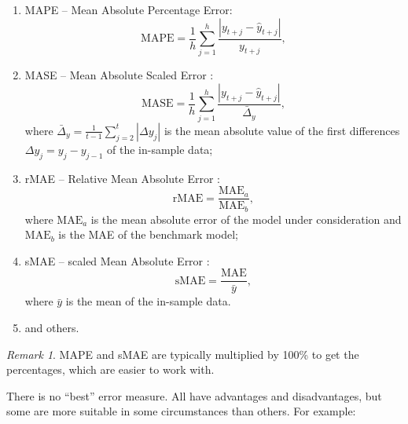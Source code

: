 \documentclass[
]{book}
\providecommand{\tightlist}{%
  \setlength{\itemsep}{0pt}\setlength{\parskip}{0pt}}
\theoremstyle{definition}
\theoremstyle{definition}
\theoremstyle{definition}
\theoremstyle{definition}
\theoremstyle{remark}
\newtheorem*{remark}{Remark}
\begin{document}
\begin{enumerate}
\def\labelenumi{\arabic{enumi}.}
\tightlist
\item
  MAPE -- Mean Absolute Percentage Error:
  \begin{equation}
   \mathrm{MAPE} = \frac{1}{h} \sum_{j=1}^h \frac{|y_{t+j} -\hat{y}_{t+j}|}{y_{t+j}},
   \label{eq:MAPE}
  \end{equation}
\item
  MASE -- Mean Absolute Scaled Error \citep{Hyndman2006}:
  \begin{equation}
   \mathrm{MASE} = \frac{1}{h} \sum_{j=1}^h \frac{|y_{t+j} -\hat{y}_{t+j}|}{\bar{\Delta}_y},
   \label{eq:MASE}
  \end{equation}
  where \(\bar{\Delta}_y = \frac{1}{t-1}\sum_{j=2}^t |\Delta y_{j}|\) is the mean absolute value of the first differences \(\Delta y_{j}=y_j-y_{j-1}\) of the in-sample data;
\item
  rMAE -- Relative Mean Absolute Error \citep{Davydenko2013}:
  \begin{equation}
   \mathrm{rMAE} = \frac{\mathrm{MAE}_a}{\mathrm{MAE}_b},
   \label{eq:rMAE}
  \end{equation}
  where \(\mathrm{MAE}_a\) is the mean absolute error of the model under consideration and \(\mathrm{MAE}_b\) is the MAE of the benchmark model;
\item
  sMAE -- scaled Mean Absolute Error \citep{Petropoulos2015}:
  \begin{equation}
   \mathrm{sMAE} = \frac{\mathrm{MAE}}{\bar{y}},
   \label{eq:sMAE}
  \end{equation}
  where \(\bar{y}\) is the mean of the in-sample data.
\item
  and others.
\end{enumerate}

\begin{remark}
MAPE and sMAE are typically multiplied by 100\% to get the percentages, which are easier to work with.
\end{remark}

There is no ``best'' error measure. All have advantages and disadvantages, but some are more suitable in some circumstances than others. For example:
\end{document}
